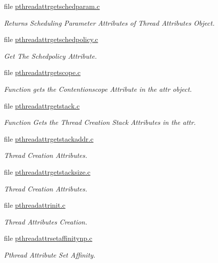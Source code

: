 \begin{DoxyCompactItemize}
file \mbox{\hyperlink{pthreadattrgetschedparam_8c}{pthreadattrgetschedparam.\+c}}
\begin{DoxyCompactList}\small\item\em Returns Scheduling Parameter Attributes of Thread Attributes Object. \end{DoxyCompactList}\item 
file \mbox{\hyperlink{pthreadattrgetschedpolicy_8c}{pthreadattrgetschedpolicy.\+c}}
\begin{DoxyCompactList}\small\item\em Get The Schedpolicy Attribute. \end{DoxyCompactList}\item 
file \mbox{\hyperlink{pthreadattrgetscope_8c}{pthreadattrgetscope.\+c}}
\begin{DoxyCompactList}\small\item\em Function gets the Contentionscope Attribute in the attr object. \end{DoxyCompactList}\item 
file \mbox{\hyperlink{pthreadattrgetstack_8c}{pthreadattrgetstack.\+c}}
\begin{DoxyCompactList}\small\item\em Function Gets the Thread Creation Stack Attributes in the attr. \end{DoxyCompactList}\item 
file \mbox{\hyperlink{pthreadattrgetstackaddr_8c}{pthreadattrgetstackaddr.\+c}}
\begin{DoxyCompactList}\small\item\em Thread Creation Attributes. \end{DoxyCompactList}\item 
file \mbox{\hyperlink{pthreadattrgetstacksize_8c}{pthreadattrgetstacksize.\+c}}
\begin{DoxyCompactList}\small\item\em Thread Creation Attributes. \end{DoxyCompactList}\item 
file \mbox{\hyperlink{pthreadattrinit_8c}{pthreadattrinit.\+c}}
\begin{DoxyCompactList}\small\item\em Thread Attributes Creation. \end{DoxyCompactList}\item 
file \mbox{\hyperlink{pthreadattrsetaffinitynp_8c}{pthreadattrsetaffinitynp.\+c}}
\begin{DoxyCompactList}\small\item\em Pthread Attribute Set Affinity. \end{DoxyCompactList}\item 

\end{DoxyCompactItemize}
